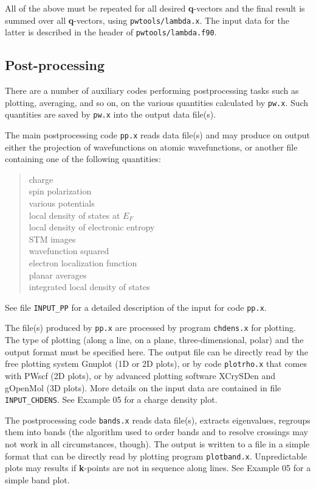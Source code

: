 \documentclass[12pt,a4paper]{article}
\begin{document}
All of the above must be repeated for all desired \textbf{q}-vectors
and the final result is summed over all \textbf{q}-vectors, using
\texttt{pwtools/lambda.x}. The input data for the latter is
described in the header of \texttt{pwtools/lambda.f90}.

\subsection{Post-processing}

There are a number of auxiliary codes performing postprocessing tasks
such as plotting, averaging, and so on, on the various quantities
calculated by \texttt{pw.x}.
Such quantities are saved by \texttt{pw.x} into the output data
file(s).

The main postprocessing code \texttt{pp.x} reads data file(s) and may
produce on output either the projection of wavefunctions on atomic
wavefunctions, or another file containing one of the following
quantities:

\begin{quote}
  charge\\
  spin polarization\\
  various potentials\\
  local density of states at $E_F$\\
  local density of electronic entropy\\
  STM images\\
  wavefunction squared\\
  electron localization function\\
  planar averages\\
  integrated local density of states
\end{quote}

See file \texttt{INPUT\_PP} for a detailed description of the input
for code \texttt{pp.x}.

The file(s) produced by \texttt{pp.x} are processed by program
\texttt{chdens.x} for plotting.
The type of plotting (along a line, on a plane, three-dimensional,
polar) and the output format must be specified here.
The output file can be directly read by the free plotting system
Gnuplot (1D or 2D plots), or by code \texttt{plotrho.x} that comes
with PWscf (2D plots), or by advanced plotting software XCrySDen and
gOpenMol (3D plots).
More details on the input data are contained in file
\texttt{INPUT\_CHDENS}.
See Example 05 for a charge density plot.

The postprocessing code \texttt{bands.x} reads data file(s), extracts
eigenvalues, regroups them into bands (the algorithm used to order
bands and to resolve crossings may not work in all circumstances,
though).
The output is written to a file in a simple format that can be
directly read by plotting program \texttt{plotband.x}.
Unpredictable plots may results if \textbf{k}-points are not in
sequence along lines.
See Example 05 for a simple band plot.
\end{document}
